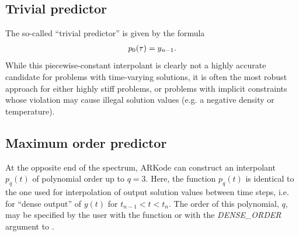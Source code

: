\documentclass[letterpaper,10pt,english]{sphinxmanual}
\begin{document}
\subsection{Trivial predictor}
\label{Mathematics:trivial-predictor}\label{Mathematics:mathematics-predictors-trivial}
The so-called ``trivial predictor'' is given by the formula
\begin{gather}
\begin{split}p_0(\tau) = y_{n-1}.\end{split}\notag
\end{gather}
While this piecewise-constant interpolant is clearly not a highly
accurate candidate for problems with time-varying solutions, it is
often the most robust approach for either highly stiff problems, or
problems with implicit constraints whose violation may cause illegal
solution values (e.g. a negative density or temperature).


\subsection{Maximum order predictor}
\label{Mathematics:maximum-order-predictor}\label{Mathematics:mathematics-predictors-max}
At the opposite end of the spectrum, ARKode can construct an
interpolant \(p_q(t)\) of polynomial order up to \(q=3\).
Here, the function \(p_q(t)\) is identical to the one used for
interpolation of output solution values between time steps, i.e. for
``dense output'' of \(y(t)\) for \(t_{n-1} < t < t_n\).
The order of this polynomial, \(q\), may be specified by the user
with the function {\hyperref[c_interface/User_callable:c.ARKodeSetDenseOrder]{\emph{}}} or with the
\emph{DENSE\_ORDER} argument to {\hyperref[f_interface/Usage:f/_/FARKSETIIN]{\emph{}}}.
\end{document}
